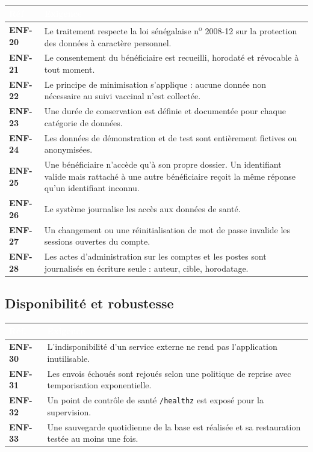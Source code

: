 \documentclass[11pt,a4paper]{article}
\newcommand{\rid}[1]{{\sffamily\bfseries\footnotesize\color{primary}#1}}
\newcommand{\hd}[1]{\textcolor{white}{\sffamily\bfseries\small #1}}
\newcommand{\rowhead}{\rowcolor{primary}}
\begin{document}
\begin{xltabular}{\textwidth}{@{}C{1.7cm} L@{}}
\toprule
\rowhead \hd{Réf.} & \hd{Exigence} \\
\midrule \endhead
\rid{ENF-20} & Le traitement respecte la loi sénégalaise n\textsuperscript{o} 2008-12 sur la protection des données à caractère personnel. \\
\rid{ENF-21} & Le consentement du bénéficiaire est recueilli, horodaté et révocable à tout moment. \\
\rid{ENF-22} & Le principe de minimisation s'applique : aucune donnée non nécessaire au suivi vaccinal n'est collectée. \\
\rid{ENF-23} & Une durée de conservation est définie et documentée pour chaque catégorie de données. \\
\rid{ENF-24} & Les données de démonstration et de test sont entièrement fictives ou anonymisées. \\
\rid{ENF-25} & Une bénéficiaire n'accède qu'à son propre dossier. Un identifiant valide mais rattaché à une autre bénéficiaire reçoit la même réponse qu'un identifiant inconnu. \\
\rid{ENF-26} & Le système journalise les accès aux données de santé. \\
\rid{ENF-27} & Un changement ou une réinitialisation de mot de passe invalide les sessions ouvertes du compte. \\
\rid{ENF-28} & Les actes d'administration sur les comptes et les postes sont journalisés en écriture seule : auteur, cible, horodatage. \\
\bottomrule
\end{xltabular}

\subsection{Disponibilité et robustesse}

\noindent
\begin{tabularx}{\textwidth}{@{}C{1.7cm} L@{}}
\toprule
\rowhead \hd{Réf.} & \hd{Exigence} \\
\midrule
\rid{ENF-30} & L'indisponibilité d'un service externe ne rend pas l'application inutilisable. \\
\rid{ENF-31} & Les envois échoués sont rejoués selon une politique de reprise avec temporisation exponentielle. \\
\rid{ENF-32} & Un point de contrôle de santé \texttt{/healthz} est exposé pour la supervision. \\
\rid{ENF-33} & Une sauvegarde quotidienne de la base est réalisée et sa restauration testée au moins une fois. \\
\bottomrule
\end{tabularx}
\end{document}
